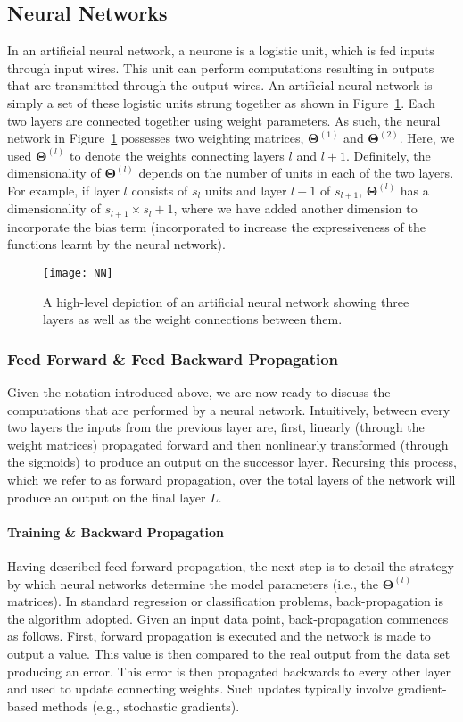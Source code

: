 \subsection{Neural Networks}
In an artificial neural network, a neurone is a logistic unit, which is fed inputs through input wires. This unit can perform computations resulting in outputs that are transmitted through the output wires. An artificial neural network is simply a set of these logistic units strung together as shown in Figure~\ref{Fig:FigTwo}. Each two layers are connected together using weight parameters. As such, the neural network in Figure~\ref{Fig:FigTwo} possesses two weighting matrices, $\bm{\Theta}^{(1)}$ and $\bm{\Theta}^{(2)}$. Here, we used $\bm{\Theta}^{(l)}$ to denote the weights connecting layers $l$ and $l+1$. Definitely, the dimensionality of $\bm{\Theta}^{(l)}$ depends on the number of units in each of the two layers. For example, if layer $l$ consists of $s_{l}$ units and layer $l+1$ of $s_{l+1}$, $\bm{\Theta}^{(l)}$ has a dimensionality of $s_{l+1} \times s_{l} +1$, where we have added another dimension to incorporate the bias term (incorporated to increase the expressiveness of the functions learnt by the neural network). 

\begin{figure}[h!]
\label{Fig:FigTwo}
\centering 
\texttt{[image: NN]}
\caption{A high-level depiction of an artificial neural network showing three layers as well as the weight connections between them.}
\end{figure}
\subsubsection{Feed Forward \& Feed Backward Propagation}
Given the notation introduced above, we are now ready to discuss the computations that are performed by a neural network. Intuitively, between every two layers the inputs from the previous layer are, first, linearly (through the weight matrices) propagated forward and then nonlinearly transformed (through the sigmoids) to produce an output on the successor layer. Recursing this process, which we refer to as forward propagation, over the total layers of the network will produce an output on the final layer $L$. 

\paragraph{Training \& Backward Propagation} Having described feed forward propagation, the next step is to detail the strategy by which neural networks determine the model parameters (i.e., the $\bm{\Theta}^{(l)}$ matrices). In standard regression or classification problems, back-propagation is the algorithm adopted. Given an input data point, back-propagation commences as follows. First, forward propagation is executed and the network is made to output a value. This value is then compared to the real output from the data set producing an error. This error is then propagated backwards to every other layer and used to update connecting weights. Such updates typically involve gradient-based methods (e.g., stochastic gradients). 